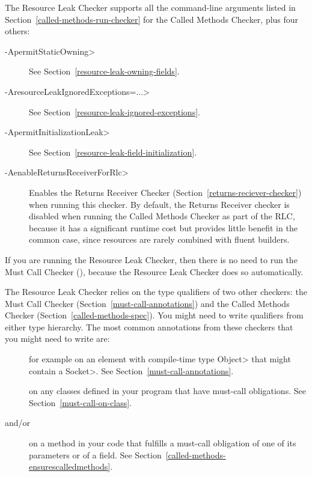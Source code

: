 The Resource Leak Checker supports all the command-line arguments
listed in Section~\ref{called-methods-run-checker} for
the Called Methods Checker, plus four others:

\begin{description}
\item[\<-ApermitStaticOwning>]
  See Section~\ref{resource-leak-owning-fields}.
\item[\<-AresourceLeakIgnoredExceptions=...>]
  See Section~\ref{resource-leak-ignored-exceptions}.
\item[\<-ApermitInitializationLeak>]
  See Section~\ref{resource-leak-field-initialization}.
\item[\<-AenableReturnsReceiverForRlc>]
  Enables the Returns Receiver Checker (Section~\ref{returns-reciever-checker})
  when running this checker. By default, the Returns Receiver checker is
  disabled when running the Called Methods Checker as part of the RLC,
  because it has a significant runtime cost but provides little benefit in the common case,
  since resources are rarely combined with fluent builders.
\end{description}

If you are running the Resource Leak Checker, then there is no need to run
the Must Call Checker (), because the
Resource Leak Checker does so automatically.



The Resource Leak Checker relies on the type qualifiers of two other checkers:
the Must Call Checker (Section~\ref{must-call-annotations}) and
the Called Methods Checker (Section~\ref{called-methods-spec}). You might need
to write qualifiers from either type hierarchy. The most common annotations from
these checkers that you might need to write are:

\begin{description}

\item[]
for example on an element with compile-time type \<Object> that might contain a \<Socket>.
See Section~\ref{must-call-annotations}.

\item[]
on any classes defined in your program that have must-call obligations. See Section~\ref{must-call-on-class}.

\item[ and/or
      ]
on a method in your code that fulfills a must-call obligation of one of its parameters or of a field.
See Section~\ref{called-methods-ensurescalledmethods}.

\end{description}

